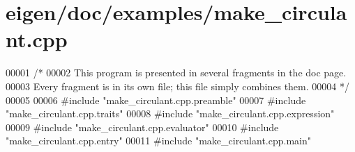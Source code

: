 \hypertarget{eigen_2doc_2examples_2make__circulant_8cpp_source}{}\section{eigen/doc/examples/make\+\_\+circulant.cpp}
\label{eigen_2doc_2examples_2make__circulant_8cpp_source}

\begin{DoxyCode}
00001 \textcolor{comment}{/*}
00002 \textcolor{comment}{This program is presented in several fragments in the doc page.}
00003 \textcolor{comment}{Every fragment is in its own file; this file simply combines them.}
00004 \textcolor{comment}{*/}
00005 
00006 \textcolor{preprocessor}{#include "make\_circulant.cpp.preamble"}
00007 \textcolor{preprocessor}{#include "make\_circulant.cpp.traits"}
00008 \textcolor{preprocessor}{#include "make\_circulant.cpp.expression"}
00009 \textcolor{preprocessor}{#include "make\_circulant.cpp.evaluator"}
00010 \textcolor{preprocessor}{#include "make\_circulant.cpp.entry"}
00011 \textcolor{preprocessor}{#include "make\_circulant.cpp.main"}
\end{DoxyCode}
